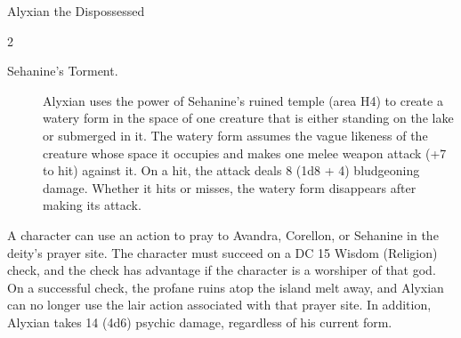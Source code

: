 \documentclass[10pt,a4paper,twoside,fancy,bg=print,twocolumn,openany,nodeprecatedcode]{dndbook}
\begin{document}
\begin{DndMonster}[float*=b,width=\textwidth + 8pt]{Alyxian the Dispossessed}
\begin{multicols}{2}
\begin{description}
\item[Sehanine's Torment.]
Alyxian uses the power of Sehanine's ruined temple (area H4) to create a watery form in the space of one creature that is either standing on the lake or submerged in it. The watery form assumes the vague likeness of the creature whose space it occupies and makes one melee weapon attack (+7 to hit) against it. On a hit, the attack deals 8 (1d8 + 4) bludgeoning damage. Whether it hits or misses, the watery form disappears after making its attack.

\end{description}

A character can use an action to pray to Avandra, Corellon, or Sehanine in the deity's prayer site. The character must succeed on a DC 15 Wisdom (Religion) check, and the check has advantage if the character is a worshiper of that god. On a successful check, the profane ruins atop the island melt away, and Alyxian can no longer use the lair action associated with that prayer site. In addition, Alyxian takes 14 (4d6) psychic damage, regardless of his current form.

\end{multicols}
\end{DndMonster}
\end{document}
